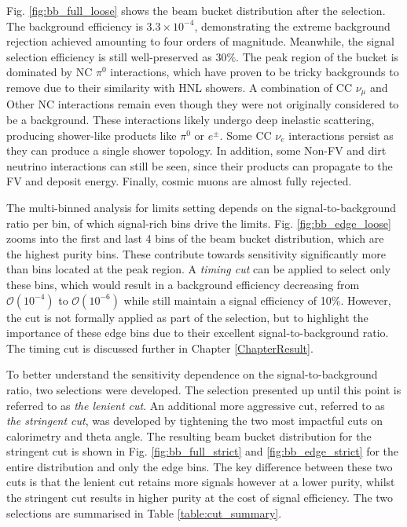 Fig. \ref{fig:bb_full_loose} shows the beam bucket distribution after the selection.
The background efficiency is $3.3 \times 10^{-4}$, demonstrating the extreme background rejection achieved amounting to four orders of magnitude.
Meanwhile, the signal selection efficiency is still well-preserved as $30\%$. 
The peak region of the bucket is dominated by NC $\pi^0$ interactions, which have proven to be tricky backgrounds to remove due to their similarity with HNL showers.
A combination of CC $\nu_\mu$ and Other NC interactions remain even though they were not originally considered to be a background.
These interactions likely undergo deep inelastic scattering, producing shower-like products like $\pi^0$ or $e^{\pm}$.
Some CC $\nu_e$ interactions persist as they can produce a single shower topology. 
In addition, some Non-FV and dirt neutrino interactions can still be seen, since their products can propagate to the FV and deposit energy.  
Finally, cosmic muons are almost fully rejected. 

The multi-binned analysis for limits setting depends on the signal-to-background ratio per bin, of which signal-rich bins drive the limits.
Fig. \ref{fig:bb_edge_loose} zooms into the first and last 4 bins of the beam bucket distribution, which are the highest purity bins.
These contribute towards sensitivity significantly more than bins located at the peak region. 
A \textit{timing cut} can be applied to select only these bins, which would result in a background efficiency decreasing from $\mathcal{O}(10^{-4})$ to $\mathcal{O}(10^{-6})$ while still maintain a signal efficiency of 10\%.
However, the cut is not formally applied as part of the selection, but to highlight the importance of these edge bins due to their excellent signal-to-background ratio.
The timing cut is discussed further in Chapter \ref{ChapterResult}.

To better understand the sensitivity dependence on the signal-to-background ratio, two selections were developed.
The selection presented up until this point is referred to as \textit{the lenient cut}.
An additional more aggressive cut, referred to as \textit{the stringent cut}, was developed by tightening the two most impactful cuts on calorimetry and theta angle. 
The resulting beam bucket distribution for the stringent cut is shown in Fig. \ref{fig:bb_full_strict} and \ref{fig:bb_edge_strict} for the entire distribution and only the edge bins. 
The key difference between these two cuts is that the lenient cut retains more signals however at a lower purity, whilst the stringent cut results in higher purity at the cost of signal efficiency.
The two selections are summarised in Table \ref{table:cut_summary}.

